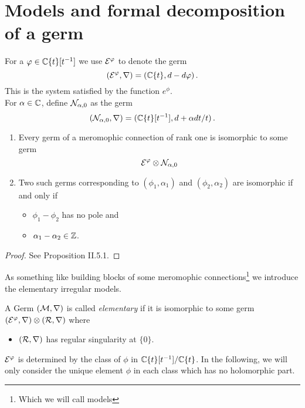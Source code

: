 \section{Models and formal decomposition of a germ}
\begin{paracol}{2}\sloppy
\switchcolumn[0]\noindent
  For a $\varphi\in\mathbb{C}\{t\}[t^{-1}]$ we use $\mathcal{E}^{\varphi}$ to denote the germ
  \[
    (\mathcal{E}^{\varphi},\nabla)=(\mathbb{C}\{t\},d-d\varphi)\,.
  \]
  This is the system satisfied by the function $e^\phi$.
  \\For $\alpha\in\mathbb{C}$, define $\mathcal{N}_{\alpha,0}$ as the germ
  \[
    (\mathcal{N}_{\alpha,0},\nabla)=(\mathbb{C}\{t\}[t^{-1}],d+\alpha dt/t)\,.
  \]
  \begin{prop}
    \begin{enumerate}
      \item Every germ of a meromophic connection of rank one is isomorphic to
        some germ
        \[
          \mathcal{E}^\varphi\otimes\mathcal{N}_{\alpha,0}
        \]
      \item Two such germs corresponding to $(\phi_1,\alpha_1)$ and
        $(\phi_2,\alpha_2)$ are isomorphic if and only if
        \begin{itemize}
          \item $\phi_1-\phi_2$ has no pole and
          \item $\alpha_1-\alpha_2\in\mathbb{Z}$.
        \end{itemize}
    \end{enumerate}
  \end{prop}
  \begin{proof}
    See \cite{sabbah2007isomonodromic} Proposition II.5.1.
  \end{proof}
\switchcolumn[1]\noindent
  As something like building blocks of some meromophic
  connections\footnote{Which we will call models} we introduce the elementary
  irregular models.
  \begin{defn}
    A Germ $(\mathcal{M},\nabla)$ is called \emph{elementary} if it is isomorphic to
    some germ $(\mathcal{E}^\varphi,\nabla)\otimes(\mathcal{R},\nabla)$ where
    \begin{itemize}
      \item $(\mathcal{R},\nabla)$ has regular singularity at $\{0\}$.
    \end{itemize}
  \end{defn}
\end{paracol}
\begin{cor}
  $\mathcal{E}^\varphi$ is determined by the class of $\phi$ in
  $\mathbb{C}\{t\}[t^{-1}]/\mathbb{C}\{t\}$. In the following, we will only consider the
  unique element $\phi$ in each class which has no holomorphic part.
\end{cor}
